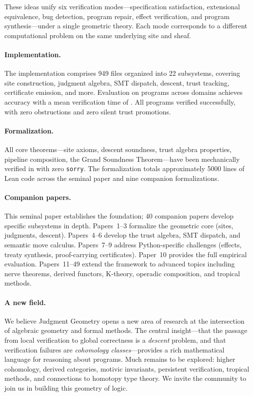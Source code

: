 \noindent
These ideas unify six verification modes---specification satisfaction,
extensional equivalence, bug detection, program repair, effect
verification, and program synthesis---under a single geometric theory.
Each mode corresponds to a different computational problem on the
same underlying site and sheaf.

\paragraph{Implementation.}
The \JuGeo{} implementation comprises 949 files organized into
22 subsystems, covering site construction, judgment algebra, SMT
dispatch, descent, trust tracking, certificate emission, and more.
Evaluation on \expTotalPrograms{} programs across \expDomainCount{}
domains achieves \expAccuracy{} accuracy with a mean verification
time of \expTimeMean{}.  All \expVerified{} programs verified
successfully, with zero obstructions and zero silent trust promotions.

\paragraph{Formalization.}
All core theorems---site axioms, descent soundness, trust algebra
properties, pipeline composition, the Grand Soundness Theorem---have
been mechanically verified in \LEAN{} with zero \texttt{sorry}.
The formalization totals approximately 5000 lines of Lean code across
the seminal paper and nine companion formalizations.

\paragraph{Companion papers.}
This seminal paper establishes the foundation; 40 companion papers
develop specific subsystems in depth.  Papers~1--3 formalize the
geometric core (sites, judgments, descent).  Papers~4--6 develop the
trust algebra, SMT dispatch, and semantic move calculus.
Papers~7--9 address Python-specific challenges (effects, treaty
synthesis, proof-carrying certificates).  Paper~10 provides the
full empirical evaluation.  Papers~11--49 extend the framework to
advanced topics including nerve theorems, derived functors, K-theory,
operadic composition, and tropical methods.

\paragraph{A new field.}
We believe Judgment Geometry opens a new area of research at the
intersection of algebraic geometry and formal methods.  The central
insight---that the passage from local verification to global
correctness is a \emph{descent} problem, and that verification
failures are \emph{cohomology classes}---provides a rich mathematical
language for reasoning about programs.  Much remains to be explored:
higher cohomology, derived categories, motivic invariants, persistent
verification, tropical methods, and connections to homotopy type
theory.  We invite the community to join us in building this geometry
of logic.
